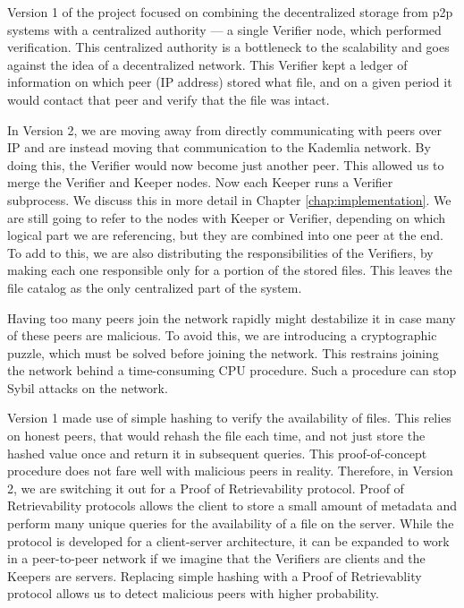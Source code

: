 Version 1 of the project focused on combining the decentralized storage from p2p systems with a centralized authority — a single Verifier node, which performed verification.
This centralized authority is a bottleneck to the scalability and goes against the idea of a decentralized network.
This Verifier kept a ledger of information on which peer (IP address) stored what file, and on a given period it would contact that peer and verify that the file was intact.

In Version 2, we are moving away from directly communicating with peers over IP and are instead moving that communication to the Kademlia network.
By doing this, the Verifier would now become just another peer.
This allowed us to merge the Verifier and Keeper nodes.
Now each Keeper runs a Verifier subprocess.
We discuss this in more detail in Chapter \ref{chap:implementation}.
We are still going to refer to the nodes with Keeper or Verifier, depending on which logical part we are referencing, but they are combined into one peer at the end.
To add to this, we are also distributing the responsibilities of the Verifiers, by making each one responsible only for a portion of the stored files.
This leaves the file catalog as the only centralized part of the system.

Having too many peers join the network rapidly might destabilize it in case many of these peers are malicious.
To avoid this, we are introducing a cryptographic puzzle, which must be solved before joining the network.
This restrains joining the network behind a time-consuming CPU procedure.
Such a procedure can stop Sybil attacks on the network.

Version 1 made use of simple hashing to verify the availability of files.
This relies on honest peers, that would rehash the file each time, and not just store the hashed value once and return it in subsequent queries.
This proof-of-concept procedure does not fare well with malicious peers in reality.
Therefore, in Version 2, we are switching it out for a Proof of Retrievability\cite{porfirst} protocol.
Proof of Retrievability protocols allows the client to store a small amount of metadata and perform many unique queries for the availability of a file on the server.
While the protocol is developed for a client-server architecture, it can be expanded to work in a peer-to-peer network if we imagine that the Verifiers are clients and the Keepers are servers.
Replacing simple hashing with a Proof of Retrievablity protocol allows us to detect malicious peers with higher probability.
